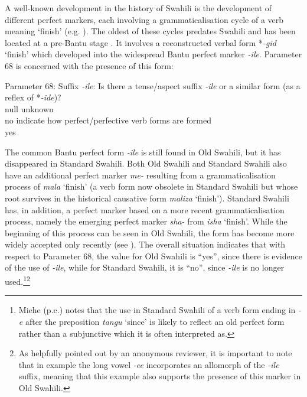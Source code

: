 \documentclass[output=paper]{langscibook}
\begin{document}
A well-known development in the history of Swahili is the development of different perfect markers, each involving a grammaticalisation cycle of a verb meaning ‘finish’ (e.g. \citealt{HeineReh1984, Marten1998, Drolc2000}). The oldest of these cycles predates Swahili and has been located at a pre-Bantu stage \citep{Voeltz1980}. It involves a reconstructed verbal form *\textit{{}-gid} ‘finish’ which developed into the widespread Bantu perfect marker \textit{{}-ile}. Parameter 68 is concerned with the presence of this form:

\ea\label{ex:marten:36}Parameter 68: Suffix \textit{{}-ile}: Is there a tense/aspect suffix \textit{{}-ile} or a similar form (as a reflex of *\textit{{}-ide})? \\
\glll null\hspace{1ex}    unknown\\
no      {indicate how perfect/perfective verb forms are formed}\\
yes {}\\
\z

The common Bantu perfect form \textit{{}-ile} is still found in Old Swahili, but it has disappeared in Standard Swahili. Both Old Swahili and Standard Swahili also have an additional perfect marker \textit{me-} resulting from a grammaticalisation process of \textit{{}mala} ‘finish’ (a verb form now obsolete in Standard Swahili but whose root survives in the historical causative form \textit{{}maliza} ‘finish’). Standard Swahili has, in addition, a perfect marker based on a more recent grammaticalisation process, namely the emerging perfect marker \textit{sha-} from \textit{{}isha} ‘finish’. While the beginning of this process can be seen in Old Swahili, the form has become more widely accepted only recently (see \citealt{Marten1998}). The overall situation indicates that with respect to Parameter 68, the value for Old Swahili is ``yes'', since there is evidence of the use of \textit{{}-ile}, while for Standard Swahili, it is ``no'', since \textit{{}-ile} is no longer used.\footnote{Miehe (p.c.) notes that the use in Standard Swahili of a verb form ending in \textit{{}-e} after the preposition \textit{tangu} ‘since’ is likely to reflect an old perfect form rather than a subjunctive which it is often interpreted as.}\footnote{As helpfully pointed out by an anonymous reviewer, it is important to note that in example  the long vowel \textit{{}-ee} incorporates an allomorph of the \textit{{}-ile} suffix, meaning that this example also supports the presence of this marker in Old Swahili.} 
\end{document}
